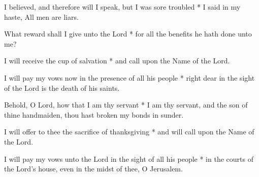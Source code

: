 I believed, and therefore will I speak, but I was sore troubled * I said in my haste, All men are liars.

What reward shall I give unto the Lord * for all the benefits he hath done unto me?

I will receive the cup of salvation * and call upon the Name of the Lord.

I will pay my vows now in the presence of all his people * right dear in the sight of the Lord is the death of his saints.

Behold, O Lord, how that I am thy servant * I am thy servant, and the son of thine handmaiden, thou hast broken my bonds in sunder.

I will offer to thee the sacrifice of thanksgiving * and will call upon the Name of the Lord.

I will pay my vows unto the Lord in the sight of all his people * in the courts of the Lord's house, even in the midst of thee, O Jerusalem.